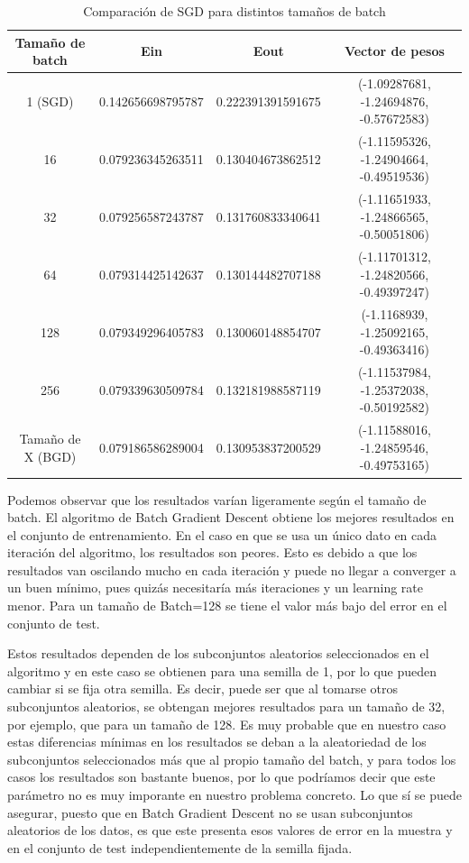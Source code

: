 \documentclass[a4]{article}
\begin{document}
\begin{table}[htbp]
	\centering
	\caption{Comparación de SGD para distintos tamaños de batch}
	\begin{tabular}{|c|c|c|c|}
		\hline
		\textbf{Tamaño de batch} & \textbf{Ein} & \textbf{Eout} & \textbf{Vector de pesos} \\ \hline
		1 (SGD) & 0.142656698795787 & 0.222391391591675 & (-1.09287681, -1.24694876, -0.57672583) \\ \hline
		16 & 0.079236345263511 & 0.130404673862512 & (-1.11595326, -1.24904664, -0.49519536) \\ \hline
		32 & 0.079256587243787 & 0.131760833340641 & (-1.11651933, -1.24866565, -0.50051806) \\ \hline
		64 & 0.079314425142637 & 0.130144482707188 & (-1.11701312, -1.24820566, -0.49397247) \\ \hline
		128 & 0.079349296405783 & 0.130060148854707 & (-1.1168939,  -1.25092165, -0.49363416) \\ \hline
		256 & 0.079339630509784 & 0.132181988587119 & (-1.11537984, -1.25372038, -0.50192582) \\ \hline
		Tamaño de X (BGD) & 0.079186586289004 & 0.130953837200529 & (-1.11588016, -1.24859546, -0.49753165) \\ \hline
	\end{tabular}
	\label{}
\end{table}

\vspace{-2mm}

Podemos observar que los resultados varían ligeramente según el tamaño de batch. El algoritmo de Batch Gradient Descent obtiene los mejores resultados en el conjunto de entrenamiento. En el caso en que se usa un único dato en cada iteración del algoritmo, los resultados son peores. Esto es debido a que los resultados van oscilando mucho en cada iteración y puede no llegar a converger a un buen mínimo, pues quizás necesitaría más iteraciones y un learning rate menor. Para un tamaño de Batch=128 se tiene el valor más bajo del error en el conjunto de test.

 Estos resultados dependen de los subconjuntos aleatorios seleccionados en el algoritmo y en este caso se obtienen para una semilla de 1, por lo que pueden cambiar si se fija otra semilla. Es decir, puede ser que al tomarse otros subconjuntos aleatorios, se obtengan mejores resultados para un tamaño de 32, por ejemplo, que para un tamaño de 128. Es muy probable que en nuestro caso estas diferencias mínimas en los resultados se deban a la aleatoriedad de los subconjuntos seleccionados más que al propio tamaño del batch, y para todos los casos los resultados son bastante buenos, por lo que podríamos decir que este parámetro no es muy imporante en nuestro problema concreto. Lo que sí se puede asegurar, puesto que en Batch Gradient Descent no se usan subconjuntos aleatorios de los datos, es que este presenta esos valores de error en la muestra y en el conjunto de test independientemente de la semilla fijada. 
\end{document}
